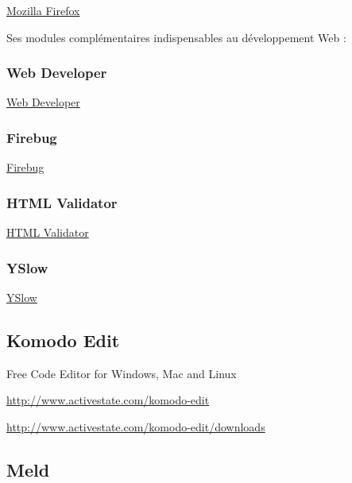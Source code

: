 \documentclass[letterpaper,10pt,french]{manual}
\begin{document}
\href{http://www.mozilla-europe.org/fr/firefox/}{Mozilla Firefox}

Ses modules complémentaires indispensables au développement Web :


\subsubsection{Web Developer}

\href{https://addons.mozilla.org/fr/firefox/addon/60/}{Web Developer}


\subsubsection{Firebug}

\href{https://addons.mozilla.org/fr/firefox/addon/1843/}{Firebug}


\subsubsection{HTML Validator}

\href{https://addons.mozilla.org/fr/firefox/addon/249/}{HTML Validator}


\subsubsection{YSlow}

\href{https://addons.mozilla.org/fr/firefox/addon/5369/}{YSlow}

\resetcurrentobjects
\hypertarget{--doc-outils/komodo-edit}{}

\hypertarget{komodo-edit}{}\subsection{Komodo Edit}

Free Code Editor for Windows, Mac and Linux

\href{http://www.activestate.com/komodo-edit}{http://www.activestate.com/komodo-edit}

\href{http://www.activestate.com/komodo-edit/downloads}{http://www.activestate.com/komodo-edit/downloads}

\resetcurrentobjects
\hypertarget{--doc-outils/meld}{}

\hypertarget{meld}{}\subsection{Meld}
\end{document}
